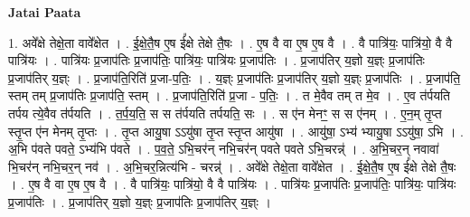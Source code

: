 \documentclass[17pt]{extarticle}
\begin{document}
\textbf{Jatai Paata} \newline

1. अवे᳚क्षे तेक्षे॒ता वावे᳚क्षेत । . ई॒क्षे॒तै॒ष ए॒ष ई᳚क्षे तेक्षे तै॒षः । . ए॒ष वै वा ए॒ष ए॒ष वै । . वै पात्रि॑यः॒ पात्रि॑यो॒ वै वै पात्रि॑यः । . पात्रि॑यः प्र॒जाप॑तिः प्र॒जाप॑तिः॒ पात्रि॑यः॒ पात्रि॑यः प्र॒जाप॑तिः । . प्र॒जाप॑तिर् य॒ज्ञो य॒ज्ञ्ः प्र॒जाप॑तिः प्र॒जाप॑तिर् य॒ज्ञ्ः । . प्र॒जाप॑ति॒रिति॑ प्र॒जा-प॒तिः॒ । . य॒ज्ञ्ः प्र॒जाप॑तिः प्र॒जाप॑तिर् य॒ज्ञो य॒ज्ञ्ः प्र॒जाप॑तिः । . प्र॒जाप॑ति॒ स्तम् तम् प्र॒जाप॑तिः प्र॒जाप॑ति॒ स्तम् । . प्र॒जाप॑ति॒रिति॑ प्र॒जा - प॒तिः॒ । . त मे॒वैव तम् त मे॒व । . ए॒व त॑र्पयति तर्पय त्ये॒वैव त॑र्पयति । . त॒र्प॒य॒ति॒ स स त॑र्पयति तर्पयति॒ सः । . स ए॑न मेनꣳ॒॒ स स ए॑नम् । . ए॒न॒म् तृ॒प्त स्तृ॒प्त ए॑न मेनम् तृ॒प्तः । . तृ॒प्त आयु॒षा ऽऽयु॑षा तृ॒प्त स्तृ॒प्त आयु॑षा । . आयु॑षा॒ ऽभ्य॑ भ्यायु॒षा ऽऽयु॑षा॒ ऽभि । . अ॒भि प॑वते पवते॒ ऽभ्य॑भि प॑वते । . प॒व॒ते॒ ऽभि॒चर॑न् नभि॒चर॑न् पवते पवते ऽभि॒चरन्न्॑ । . अ॒भि॒चर॒न् नवावा॑ भि॒चर॑न् नभि॒चर॒न् नव॑ । . अ॒भि॒चर॒न्नित्य॑भि - चरन्न्॑ । . अवे᳚क्षे तेक्षे॒ता वावे᳚क्षेत । . ई॒क्षे॒तै॒ष ए॒ष ई᳚क्षे तेक्षे तै॒षः । . ए॒ष वै वा ए॒ष ए॒ष वै । . वै पात्रि॑यः॒ पात्रि॑यो॒ वै वै पात्रि॑यः । . पात्रि॑यः प्र॒जाप॑तिः प्र॒जाप॑तिः॒ पात्रि॑यः॒ पात्रि॑यः प्र॒जाप॑तिः । . प्र॒जाप॑तिर् य॒ज्ञो य॒ज्ञ्ः प्र॒जाप॑तिः प्र॒जाप॑तिर् य॒ज्ञ्ः । \newline
\end{document}
